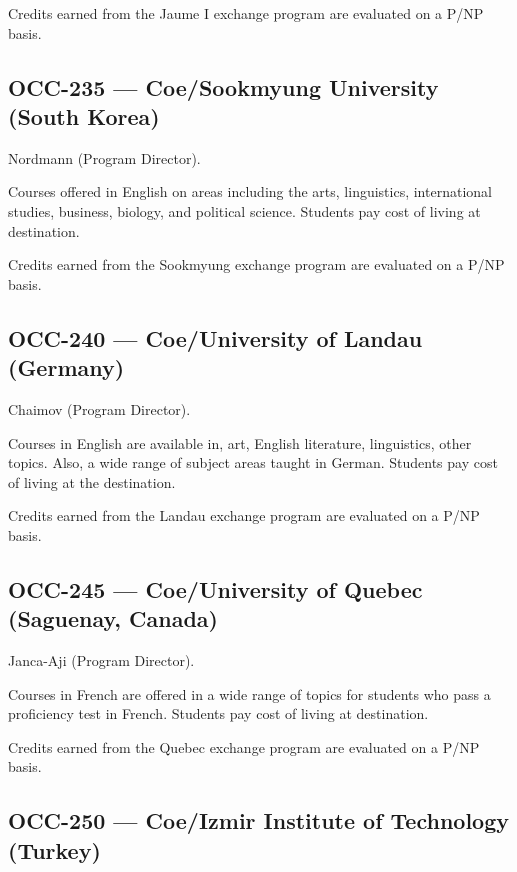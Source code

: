 \documentclass[
  letterpaper,
]{scrbook}
\begin{document}
Credits earned from the Jaume I exchange program are evaluated on a P/NP
basis.

\subsection{OCC-235 --- Coe/Sookmyung University (South
Korea)}\label{occ-235-coesookmyung-university-south-korea}

Nordmann (Program Director).

Courses offered in English on areas including the arts, linguistics,
international studies, business, biology, and political science.
Students pay cost of living at destination.

Credits earned from the Sookmyung exchange program are evaluated on a
P/NP basis.

\subsection{OCC-240 --- Coe/University of Landau
(Germany)}\label{occ-240-coeuniversity-of-landau-germany}

Chaimov (Program Director).

Courses in English are available in, art, English literature,
linguistics, other topics. Also, a wide range of subject areas taught in
German. Students pay cost of living at the destination.

Credits earned from the Landau exchange program are evaluated on a P/NP
basis.

\subsection{OCC-245 --- Coe/University of Quebec (Saguenay,
Canada)}\label{occ-245-coeuniversity-of-quebec-saguenay-canada}

Janca-Aji (Program Director).

Courses in French are offered in a wide range of topics for students who
pass a proficiency test in French. Students pay cost of living at
destination.

Credits earned from the Quebec exchange program are evaluated on a P/NP
basis.

\subsection{OCC-250 --- Coe/Izmir Institute of Technology
(Turkey)}\label{occ-250-coeizmir-institute-of-technology-turkey}
\end{document}
